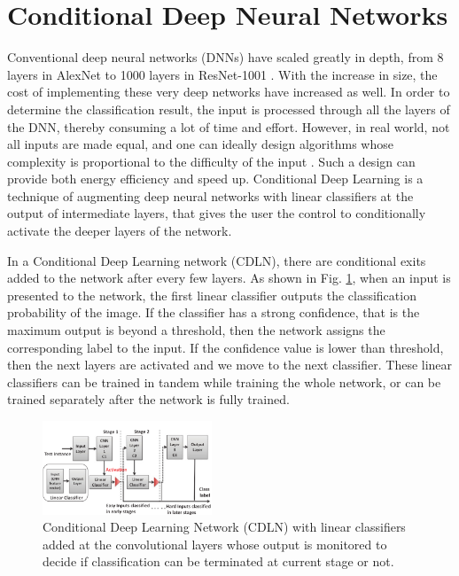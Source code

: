 \section{Conditional Deep Neural Networks}
\label{sec:conditional}


Conventional deep neural networks (DNNs) have scaled greatly in depth, from 8 layers in AlexNet \cite{krizhevsky2012imagenet} to 1000 layers in ResNet-1001 \cite{he2016identity}. With the increase in size, the cost of implementing these very deep networks have increased as well. In order to determine the classification result, the input is processed through all the layers of the DNN, thereby consuming a lot of time and effort. However, in real world, not all inputs are made equal, and one can ideally design algorithms whose complexity is proportional to the difficulty of the input \cite{venkataramani2015scalable}. Such a design can provide both energy efficiency and speed up. Conditional Deep Learning \cite{panda2017energy, panda2016conditional} is a technique of augmenting deep neural networks with linear classifiers at the output of intermediate layers, that gives the user the control to conditionally activate the deeper layers of the network. 

In a Conditional Deep Learning network (CDLN), there are conditional exits added to the network after every few layers. As shown in Fig. \ref{fig:CDL-1}, when an input is presented to the network, the first linear classifier outputs the classification probability of the image. If the classifier has a strong confidence, that is the maximum output is beyond a threshold, then the network assigns the corresponding label to the input. If the confidence value is lower than threshold, then the next layers are activated and we move to the next classifier. These linear classifiers can be trained in tandem while training the whole network, or can be trained separately after the network is fully trained. 

\begin{figure}[h]
\centering
\includegraphics[width=0.45\textwidth]{CDL_1.png}
\caption{Conditional Deep Learning Network (CDLN) with linear classifiers added at the convolutional layers whose output is monitored to decide if classification can be terminated at current stage or not.} \label{fig:CDL-1}
\end{figure}

